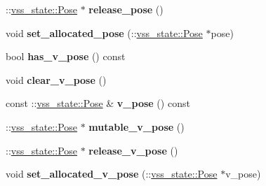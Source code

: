 \begin{DoxyCompactItemize}
\item 
\+::\hyperlink{classvss__state_1_1Pose}{vss\+\_\+state\+::\+Pose} $\ast$ {\bfseries release\+\_\+pose} ()\hypertarget{classvss__state_1_1Robot__State_ad644f3a9823f0cf600305257b0608b46}{}\label{classvss__state_1_1Robot__State_ad644f3a9823f0cf600305257b0608b46}

\item 
void {\bfseries set\+\_\+allocated\+\_\+pose} (\+::\hyperlink{classvss__state_1_1Pose}{vss\+\_\+state\+::\+Pose} $\ast$pose)\hypertarget{classvss__state_1_1Robot__State_af8564fc0f0e930796b9ba74fbf02b057}{}\label{classvss__state_1_1Robot__State_af8564fc0f0e930796b9ba74fbf02b057}

\item 
bool {\bfseries has\+\_\+v\+\_\+pose} () const \hypertarget{classvss__state_1_1Robot__State_a99a2138f4352bfac49f101ef1a3e2aa3}{}\label{classvss__state_1_1Robot__State_a99a2138f4352bfac49f101ef1a3e2aa3}

\item 
void {\bfseries clear\+\_\+v\+\_\+pose} ()\hypertarget{classvss__state_1_1Robot__State_ad7bb63ae44945655a400d71825c4e6cc}{}\label{classvss__state_1_1Robot__State_ad7bb63ae44945655a400d71825c4e6cc}

\item 
const \+::\hyperlink{classvss__state_1_1Pose}{vss\+\_\+state\+::\+Pose} \& {\bfseries v\+\_\+pose} () const \hypertarget{classvss__state_1_1Robot__State_af05253d869ead02f02a8ea56f0ec989f}{}\label{classvss__state_1_1Robot__State_af05253d869ead02f02a8ea56f0ec989f}

\item 
\+::\hyperlink{classvss__state_1_1Pose}{vss\+\_\+state\+::\+Pose} $\ast$ {\bfseries mutable\+\_\+v\+\_\+pose} ()\hypertarget{classvss__state_1_1Robot__State_ad5bd41bfe20e17c7c35a1cd91ff24a4a}{}\label{classvss__state_1_1Robot__State_ad5bd41bfe20e17c7c35a1cd91ff24a4a}

\item 
\+::\hyperlink{classvss__state_1_1Pose}{vss\+\_\+state\+::\+Pose} $\ast$ {\bfseries release\+\_\+v\+\_\+pose} ()\hypertarget{classvss__state_1_1Robot__State_a1d4e9041543747c034f54d98fd952d6e}{}\label{classvss__state_1_1Robot__State_a1d4e9041543747c034f54d98fd952d6e}

\item 
void {\bfseries set\+\_\+allocated\+\_\+v\+\_\+pose} (\+::\hyperlink{classvss__state_1_1Pose}{vss\+\_\+state\+::\+Pose} $\ast$v\+\_\+pose)\hypertarget{classvss__state_1_1Robot__State_a4e979918840ca68e80f7f602341ed766}{}\label{classvss__state_1_1Robot__State_a4e979918840ca68e80f7f602341ed766}


\end{DoxyCompactItemize}
